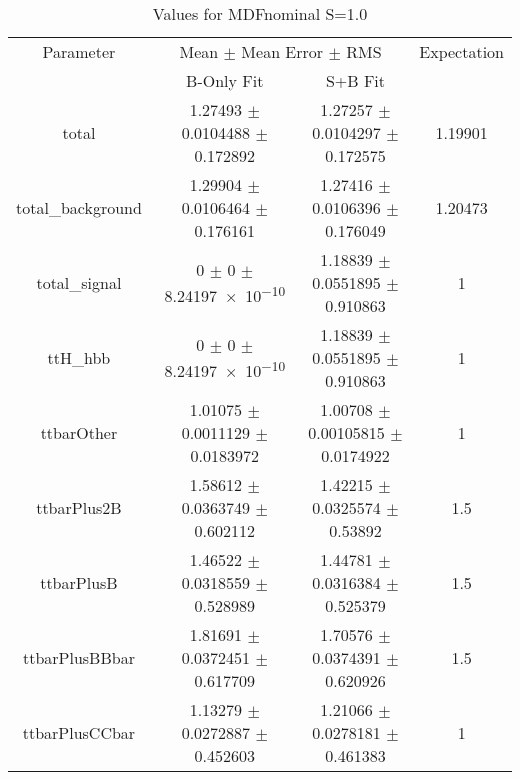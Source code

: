 \begin{table}
\centering
\caption{Values for MDFnominal S=1.0}
\begin{tabular}{cccc}
\toprule
Parameter & \multicolumn{2}{c}{Mean $\pm$ Mean Error $\pm$ RMS} & Expectation\\
 & B-Only Fit & S+B Fit & \\
\midrule
total & \num{1.27493} $\pm$ \num{0.0104488} $\pm$ \num{0.172892} & \num{1.27257} $\pm$ \num{0.0104297} $\pm$ \num{0.172575} & \num{1.19901}\\
total\_background & \num{1.29904} $\pm$ \num{0.0106464} $\pm$ \num{0.176161} & \num{1.27416} $\pm$ \num{0.0106396} $\pm$ \num{0.176049} & \num{1.20473}\\
total\_signal & \num{0} $\pm$ \num{0} $\pm$ \num{8.24197e-10} & \num{1.18839} $\pm$ \num{0.0551895} $\pm$ \num{0.910863} & \num{1}\\
ttH\_hbb & \num{0} $\pm$ \num{0} $\pm$ \num{8.24197e-10} & \num{1.18839} $\pm$ \num{0.0551895} $\pm$ \num{0.910863} & \num{1}\\
ttbarOther & \num{1.01075} $\pm$ \num{0.0011129} $\pm$ \num{0.0183972} & \num{1.00708} $\pm$ \num{0.00105815} $\pm$ \num{0.0174922} & \num{1}\\
ttbarPlus2B & \num{1.58612} $\pm$ \num{0.0363749} $\pm$ \num{0.602112} & \num{1.42215} $\pm$ \num{0.0325574} $\pm$ \num{0.53892} & \num{1.5}\\
ttbarPlusB & \num{1.46522} $\pm$ \num{0.0318559} $\pm$ \num{0.528989} & \num{1.44781} $\pm$ \num{0.0316384} $\pm$ \num{0.525379} & \num{1.5}\\
ttbarPlusBBbar & \num{1.81691} $\pm$ \num{0.0372451} $\pm$ \num{0.617709} & \num{1.70576} $\pm$ \num{0.0374391} $\pm$ \num{0.620926} & \num{1.5}\\
ttbarPlusCCbar & \num{1.13279} $\pm$ \num{0.0272887} $\pm$ \num{0.452603} & \num{1.21066} $\pm$ \num{0.0278181} $\pm$ \num{0.461383} & \num{1}\\
\bottomrule
\end{tabular}
\end{table}